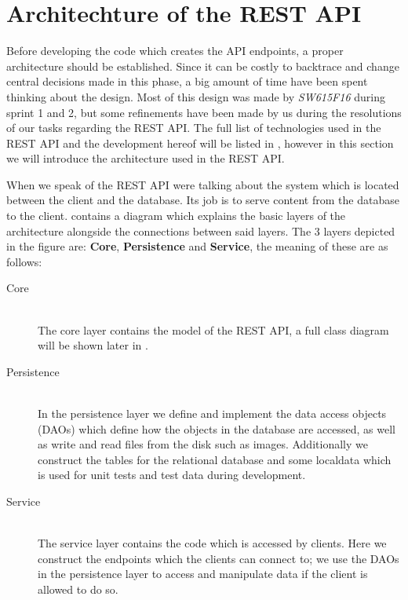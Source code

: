 \section{Architechture of the REST API}
Before developing the code which creates the API endpoints, a proper architecture should be established.
Since it can be costly to backtrace and change central decisions made in this phase, a big amount of time have been spent thinking about the design.
Most of this design was made by \textit{SW615F16} during sprint 1 and 2, but some refinements have been made by us during the resolutions of our tasks regarding the REST API.
The full list of technologies used in the REST API and the development hereof will be listed in , however in this section we will introduce the architecture used in the REST API.

When we speak of the REST API were talking about the system which is located between the client and the database.
Its job is to serve content from the database to the client.
 contains a diagram which explains the basic layers of the architecture alongside the connections between said layers.
The 3 layers depicted in the figure are: \textbf{Core}, \textbf{Persistence} and \textbf{Service}, the meaning of these are as follows:
\begin{description}
    \item[Core] \hfill \\
    The core layer contains the model of the REST API, a full class diagram will be shown later in .

    \item[Persistence] \hfill \\
    In the persistence layer we define and implement the data access objects (DAOs) which define how the objects in the database are accessed, as well as write and read files from the disk such as images.
    Additionally we construct the tables for the relational database and some localdata which is used for unit tests and test data during development.

    \item[Service] \hfill \\
    The service layer contains the code which is accessed by clients.
    Here we construct the endpoints which the clients can connect to; we use the DAOs in the persistence layer to access and manipulate data if the client is allowed to do so.
\end{description}

